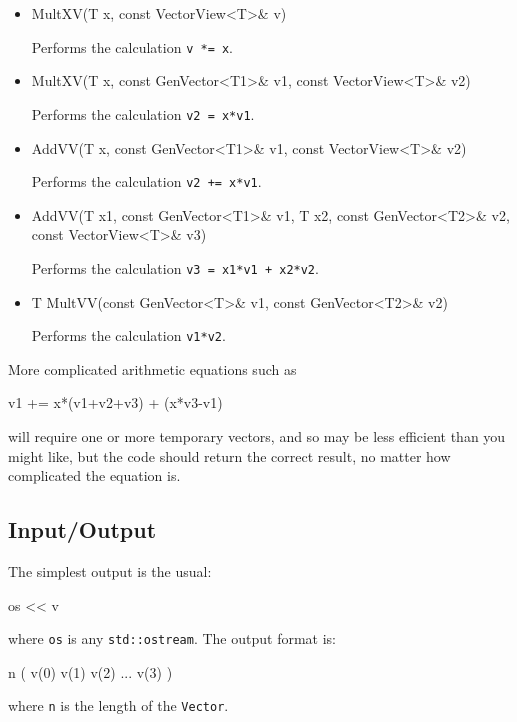 \documentclass[twoside,letterpaper,11pt]{article}
\renewcommand{\tt}[1]{{\lstinline {#1}}}
\begin{document}
\begin{itemize}

\item
\begin{tmvcode}
MultXV(T x, const VectorView<T>& v)
\end{tmvcode}
Performs the calculation \tt{v *= x}.

\item
\begin{tmvcode}
MultXV(T x, const GenVector<T1>& v1, const VectorView<T>& v2)
\end{tmvcode}
Performs the calculation \tt{v2 = x*v1}.

\item
\begin{tmvcode}
AddVV(T x, const GenVector<T1>& v1, const VectorView<T>& v2)
\end{tmvcode}
Performs the calculation \tt{v2 += x*v1}.

\item
\begin{tmvcode}
AddVV(T x1, const GenVector<T1>& v1, T x2, const GenVector<T2>& v2,
      const VectorView<T>& v3)
\end{tmvcode}
Performs the calculation \tt{v3 = x1*v1 + x2*v2}.

\item
\begin{tmvcode}
T MultVV(const GenVector<T>& v1, const GenVector<T2>& v2)
\end{tmvcode}
Performs the calculation \tt{v1*v2}.

\end{itemize}

More complicated arithmetic equations such as
\begin{tmvcode}
v1 += x*(v1+v2+v3) + (x*v3-v1) 
\end{tmvcode}
will require one or more temporary vectors, and so may be less efficient than 
you might like, but the code should return the correct result, no matter
how complicated the equation is.

\subsection{Input/Output}
\label{Vector_IO}

The simplest output is the usual:
\begin{tmvcode}
os << v
\end{tmvcode}
where \tt{os} is any \tt{std::ostream}.
The output format is:
\begin{tmvcode}
n ( v(0)  v(1)  v(2)  ...  v(3) )
\end{tmvcode}
where \tt{n} is the length of the \tt{Vector}.
\end{document}
